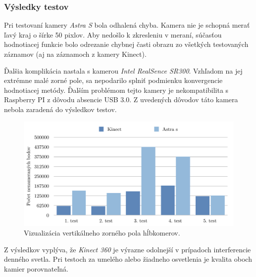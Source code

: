 \subsubsection{Výsledky testov}
Pri testovaní kamery \textit{Astra S} bola odhalená chyba. Kamera nie je schopná merať ľavý kraj o šírke 50 pixlov. Aby nedošlo k zkresleniu v meraní, súčasťou hodnotiacej funkcie bolo odrezanie chybnej časti obrazu zo všetkých testovaných záznamov (aj na záznamoch z kamery Kinect). 

Ďalšia komplikácia nastala s kamerou \textit{Intel RealSence SR300}. Vzhľadom na jej extrémne malé zorné pole, sa nepodarilo splniť podmienku konvergencie hodnotiacej metódy. Ďalším problémom tejto kamery je nekompatibilita s Raspberry PI z dôvodu absencie USB 3.0. Z uvedených dôvodov táto kamera nebola zaradená do výsledkov testov.  

\begin{figure}[H]
\begin{center}
	\includegraphics[scale=0.7]{images/noiseGraph}
	\caption{Vizualizácia vertikálneho zorného pola hĺbkomerov.}
	\end{center}
\end{figure}

Z výsledkov vyplýva, že \textit{Kinect 360} je výrazne odolnejší v prípadoch interferencie denného svetla. Pri testoch za umelého alebo žiadneho osvetlenia je kvalita oboch kamier porovnateľná. 

















